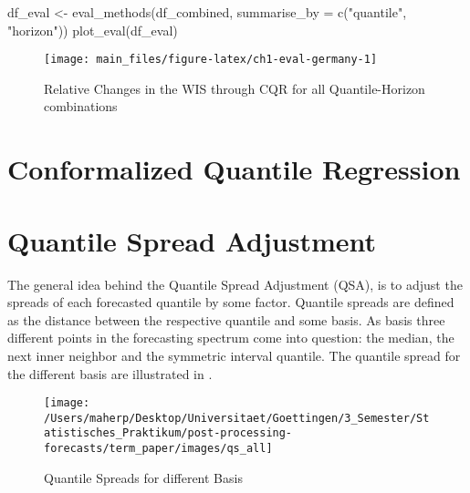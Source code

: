 \documentclass[
]{article}
\newenvironment{Shaded}{\begin{snugshade}}{\end{snugshade}}
\newcommand{\AttributeTok}[1]{\textcolor[rgb]{0.77,0.63,0.00}{#1}}
\newcommand{\FunctionTok}[1]{\textcolor[rgb]{0.00,0.00,0.00}{#1}}
\newcommand{\NormalTok}[1]{#1}
\newcommand{\OtherTok}[1]{\textcolor[rgb]{0.56,0.35,0.01}{#1}}
\newcommand{\StringTok}[1]{\textcolor[rgb]{0.31,0.60,0.02}{#1}}
\begin{document}
\begin{Shaded}
\begin{Highlighting}[]
\NormalTok{df\_eval }\OtherTok{\textless{}{-}} \FunctionTok{eval\_methods}\NormalTok{(df\_combined, }\AttributeTok{summarise\_by =} \FunctionTok{c}\NormalTok{(}\StringTok{"quantile"}\NormalTok{, }\StringTok{"horizon"}\NormalTok{))}
\FunctionTok{plot\_eval}\NormalTok{(df\_eval)}
\end{Highlighting}
\end{Shaded}

\begin{figure}

{\centering \texttt{[image: main\_files/figure-latex/ch1-eval-germany-1]} 

}

\caption{Relative Changes in the WIS through CQR for all Quantile-Horizon combinations}\label{fig:ch1-eval-germany}
\end{figure}

\newpage

\hypertarget{cqr}{%
\section{Conformalized Quantile Regression}\label{cqr}}

\newpage

\hypertarget{qsa}{%
\section{Quantile Spread Adjustment}\label{qsa}}

The general idea behind the Quantile Spread Adjustment (QSA), is to adjust the spreads of each forecasted quantile by some factor. Quantile spreads are defined as the distance between the respective quantile and some basis. As basis three different points in the forecasting spectrum come into question: the median, the next inner neighbor and the symmetric interval quantile. The quantile spread for the different basis are illustrated in .

\begin{figure}

{\centering \texttt{[image: /Users/maherp/Desktop/Universitaet/Goettingen/3\_Semester/Statistisches\_Praktikum/post-processing-forecasts/term\_paper/images/qs\_all]} 

}

\caption{Quantile Spreads for different Basis}\label{fig:qs-basis}
\end{figure}
\end{document}
